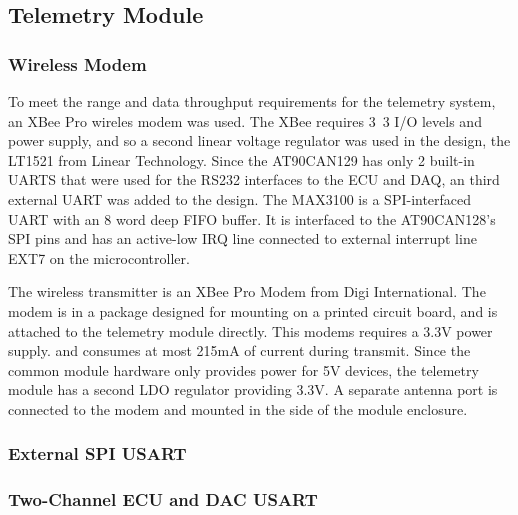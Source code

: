 \subsection{Telemetry Module}


\subsubsection{Wireless Modem}

To meet the range and data throughput requirements for the telemetry system, an XBee Pro wireles modem was used. The XBee requires \unit{3.3}{\volt} I/O levels and power supply, and so a second linear voltage regulator was used in the design, the LT1521 from Linear Technology. Since the AT90CAN129 has only 2 built-in UARTS that were used for the RS232 interfaces to the ECU and DAQ, an third external UART was added to the design. The MAX3100 is a SPI-interfaced UART with an 8 word deep FIFO buffer. It is interfaced to the AT90CAN128's SPI pins and has an active-low IRQ line connected to external interrupt line EXT7 on the microcontroller. 

The wireless transmitter is an XBee Pro Modem from Digi International. The modem is in a package designed for mounting on a printed circuit board, and is attached to the telemetry module directly. This modems requires a 3.3V power supply. and consumes at most 215mA of current during transmit. Since the common module hardware only provides power for 5V devices, the telemetry module has a second LDO regulator providing 3.3V. A separate antenna port is connected to the modem and mounted in the side of the module enclosure.



\subsubsection{External SPI USART}


\subsubsection{Two-Channel ECU and DAC USART}